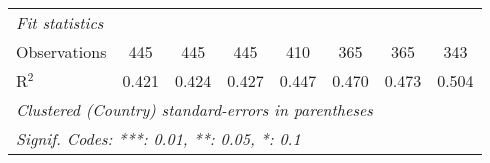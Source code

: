 \begin{tabular}{lccccccc}
   \midrule \emph{Fit statistics}\\
   Observations                                                                   & 445          & 445          & 445          & 410         & 365         & 365          & 343\\  
   R$^2$                                                                          & 0.421        & 0.424        & 0.427        & 0.447       & 0.470       & 0.473        & 0.504\\  
   \midrule
   \multicolumn{8}{l}{\emph{Clustered (Country) standard-errors in parentheses}}\\
   \multicolumn{8}{l}{\emph{Signif. Codes: ***: 0.01, **: 0.05, *: 0.1}}\\
\end{tabular}
\par\endgroup


